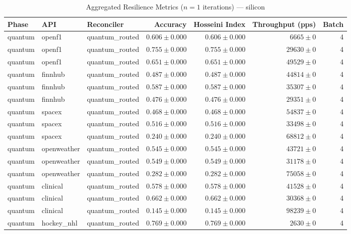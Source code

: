 
\begin{table}[htbp]
\caption{Aggregated Resilience Metrics ($n=1$ iterations) --- silicon}
\begin{tabular}{l l l r r r r}
\hline
Phase & API & Reconciler & Accuracy & Hosseini Index & Throughput (pps) & Batch \\
\hline
quantum & openf1 & quantum\_routed & $0.606\pm0.000$ & $0.606\pm0.000$ & $6665\pm0$ & 4 \\
quantum & openf1 & quantum\_routed & $0.755\pm0.000$ & $0.755\pm0.000$ & $29630\pm0$ & 4 \\
quantum & openf1 & quantum\_routed & $0.651\pm0.000$ & $0.651\pm0.000$ & $49529\pm0$ & 4 \\
quantum & finnhub & quantum\_routed & $0.487\pm0.000$ & $0.487\pm0.000$ & $44814\pm0$ & 4 \\
quantum & finnhub & quantum\_routed & $0.587\pm0.000$ & $0.587\pm0.000$ & $35307\pm0$ & 4 \\
quantum & finnhub & quantum\_routed & $0.476\pm0.000$ & $0.476\pm0.000$ & $29351\pm0$ & 4 \\
quantum & spacex & quantum\_routed & $0.468\pm0.000$ & $0.468\pm0.000$ & $54837\pm0$ & 4 \\
quantum & spacex & quantum\_routed & $0.516\pm0.000$ & $0.516\pm0.000$ & $33498\pm0$ & 4 \\
quantum & spacex & quantum\_routed & $0.240\pm0.000$ & $0.240\pm0.000$ & $68812\pm0$ & 4 \\
quantum & openweather & quantum\_routed & $0.545\pm0.000$ & $0.545\pm0.000$ & $43721\pm0$ & 4 \\
quantum & openweather & quantum\_routed & $0.549\pm0.000$ & $0.549\pm0.000$ & $31178\pm0$ & 4 \\
quantum & openweather & quantum\_routed & $0.282\pm0.000$ & $0.282\pm0.000$ & $75058\pm0$ & 4 \\
quantum & clinical & quantum\_routed & $0.578\pm0.000$ & $0.578\pm0.000$ & $41528\pm0$ & 4 \\
quantum & clinical & quantum\_routed & $0.662\pm0.000$ & $0.662\pm0.000$ & $30368\pm0$ & 4 \\
quantum & clinical & quantum\_routed & $0.145\pm0.000$ & $0.145\pm0.000$ & $98239\pm0$ & 4 \\
quantum & hockey\_nhl & quantum\_routed & $0.769\pm0.000$ & $0.769\pm0.000$ & $2630\pm0$ & 4 \\

\end{tabular}
\end{table}
